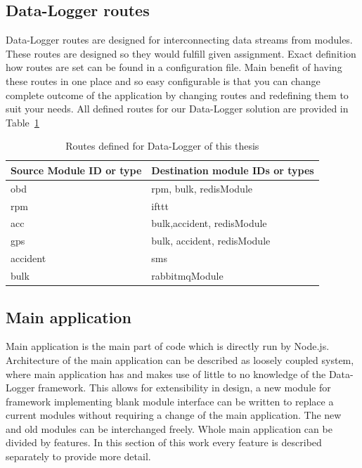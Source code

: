 \subsection{Data-Logger routes} %
\label{sub:data_logger_routes}
Data-Logger routes are designed for interconnecting data streams from modules. These routes are designed so they would fulfill given assignment. Exact definition how routes are set can be found in a configuration file. Main benefit of having these routes in one place and so easy configurable is that you can change complete outcome of the application by changing routes and redefining them to suit your needs. All defined routes for our Data-Logger solution are provided in Table~\ref{tab:tab6}
\begin{table}[H]
 \begin{center}
   \begin{tabular}{l l}
   Source Module ID or type & Destination module IDs or types\\
   \hline
   	obd & rpm, bulk, redisModule\\
    rpm & ifttt\\
    acc & bulk,accident, redisModule\\
    gps & bulk, accident, redisModule\\
    accident & sms\\
    bulk & rabbitmqModule\\
   \hline
   \end{tabular}
 \end{center}
 \caption{Routes defined for Data-Logger of this thesis}
 \label{tab:tab6}
\end{table}
\subsection{Main application} %
\label{sub:main_application}
Main application is the main part of code which is directly run by Node.js. Architecture of the main application can be described as loosely coupled system, where main application has and makes use of little to no knowledge of the Data-Logger framework. This allows for extensibility in design, a new module for framework implementing blank module interface can be written to replace a current modules without requiring a change of the main application. The new and old modules can be interchanged freely. Whole main application can be divided by features. In this section of this work every feature is described separately to provide more detail.
